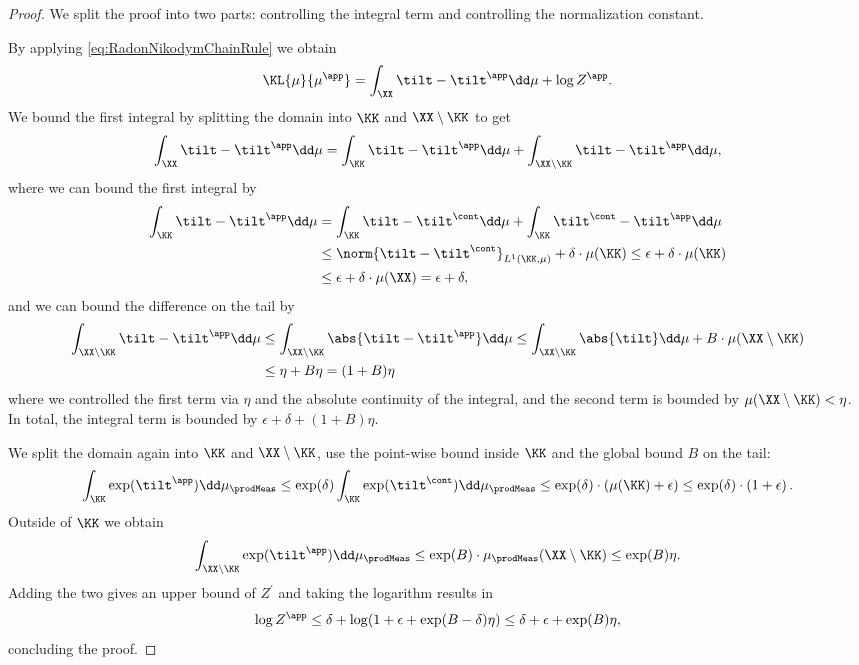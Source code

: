 \documentclass{article}
\begin{document}
\begin{proof}
 We split the proof into two parts: controlling the integral term and
 controlling the normalization constant.

  By applying \eqref{eq:RadonNikodymChainRule} we obtain
 \begin{align*}
  \KL{\mu}{\mu^\app} = \int_{\XX} \tilt - \tilt^\app \dd \mu + \log Z^\app.
 \end{align*}
 We bound the first integral by splitting the domain into $\KK$
 and $\XX\setminus\KK$ to get
 \begin{align*}
  \int_{\XX} \tilt - \tilt^\app \dd \mu =
  \int_{\KK} \tilt - \tilt^\app \dd \mu
  + \int_{\XX\setminus\KK} \tilt - \tilt^\app \dd \mu,
 \end{align*}
 where we can bound the first integral by
 \begin{align*}
  \int_{\KK} \tilt - \tilt^\app \dd \mu
   & = \int_{\KK} \tilt - \tilt^\cont \dd \mu
  + \int_{\KK} \tilt^\cont - \tilt^\app \dd \mu                 \\
   & \leq \norm{\tilt - \tilt^\cont}_{L^1(\KK, \mu)}
  + \delta \cdot \mu(\KK)
  \leq \epsilon + \delta \cdot \mu(\KK)                         \\
   & \leq \epsilon + \delta \cdot \mu(\XX) = \epsilon + \delta,
 \end{align*}
 and we can bound the difference on the tail by
 \begin{align*}
  \int_{\XX\setminus\KK} \tilt - \tilt^\app \dd \mu
   & \leq
  \int_{\XX\setminus\KK} \abs{\tilt - \tilt^\app} \dd \mu
  \leq
  \int_{\XX\setminus\KK} \abs{\tilt} \dd \mu + B \cdot \mu(\XX\setminus\KK) \\
   & \leq \eta + B\eta = (1+B) \eta
 \end{align*}
 where we controlled the first term via $\eta$ and the absolute continuity
 of the integral, and the second term is bounded by
 $\mu(\XX\setminus\KK) < \eta$. In total, the integral term is bounded by
 $\epsilon + \delta + (1+B) \eta$.

  We split the domain again into
 $\KK$ and $\XX\setminus\KK$, use the point-wise bound inside $\KK$
 and the global bound $B$ on the tail:
 \begin{align*}
  \int_{\KK} \exp(\tilt^\app) \dd \mu_\prodMeas
  \leq \exp(\delta) \int_{\KK} \exp(\tilt^\cont) \dd \mu_\prodMeas
  \leq \exp(\delta) \cdot \left(\mu(\KK) + \epsilon\right)
  \leq \exp(\delta) \cdot \left(1 + \epsilon\right).
 \end{align*}
 Outside of $\KK$ we obtain
 \begin{align*}
  \int_{\XX\setminus \KK} \exp(\tilt^\app)\dd\mu_\prodMeas
  \leq \exp(B) \cdot \mu_\prodMeas(\XX\setminus\KK) \leq \exp(B) \eta.
 \end{align*}
 Adding the two gives an upper bound of $Z^\prime$ and taking the logarithm
 results in
 \begin{align*}
  \log Z^\app \leq \delta + \log(1 + \epsilon + \exp(B - \delta)\eta)
  \leq \delta + \epsilon + \exp(B) \eta,
 \end{align*}
 concluding the proof.
\end{proof}
\end{document}
